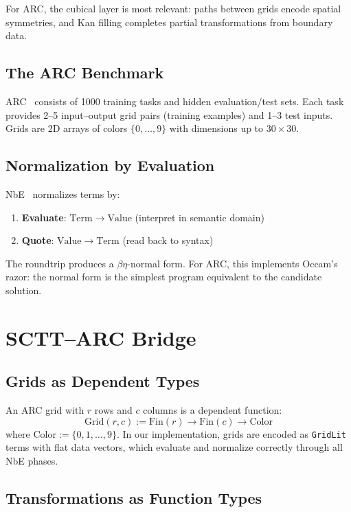\documentclass[11pt,a4paper]{article}
\newcommand{\Grid}{\mathrm{Grid}}
\newcommand{\Color}{\mathrm{Color}}
\newcommand{\Fin}{\mathrm{Fin}}
\begin{document}
For ARC, the cubical layer is most relevant: paths between grids
encode spatial symmetries, and Kan filling completes partial
transformations from boundary data.

\subsection{The ARC Benchmark}

ARC~\cite{Chollet2019} consists of 1000 training tasks and
hidden evaluation/test sets.  Each task provides 2--5 input--output grid
pairs (training examples) and 1--3 test inputs.  Grids are 2D arrays of
colors $\{0,\ldots,9\}$ with dimensions up to $30 \times 30$.

\subsection{Normalization by Evaluation}

NbE~\cite{BergerSchwichtenberg1991,Abel2013} normalizes terms by:
\begin{enumerate}[nosep]
  \item \textbf{Evaluate}: $\mathrm{Term} \to \mathrm{Value}$
    (interpret in semantic domain)
  \item \textbf{Quote}: $\mathrm{Value} \to \mathrm{Term}$
    (read back to syntax)
\end{enumerate}

The roundtrip produces a $\beta\eta$-normal form.  For ARC, this
implements Occam's razor: the normal form is the simplest program
equivalent to the candidate solution.

\section{SCTT--ARC Bridge}
\label{sec:bridge}

\subsection{Grids as Dependent Types}

An ARC grid with $r$ rows and $c$ columns is a dependent function:
\[
  \Grid(r,c) := \Fin(r) \to \Fin(c) \to \Color
\]
where $\Color := \{0,1,\ldots,9\}$.  In our implementation, grids are
encoded as \texttt{GridLit} terms with flat data vectors, which
evaluate and normalize correctly through all NbE phases.

\subsection{Transformations as Function Types}
\end{document}
